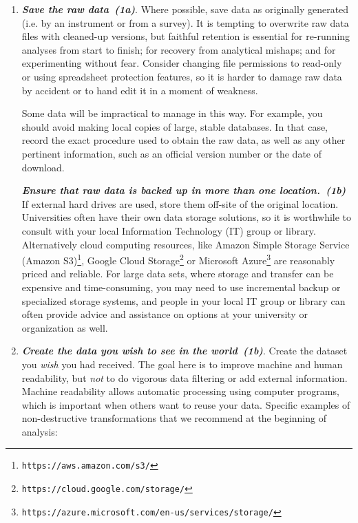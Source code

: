 \documentclass[10pt,letterpaper]{article}
\newcommand{\withurl}[2]{{#1}\footnote{{\texttt{#2}}}}
\newcommand{\practice}[2]{\textbf{\emph{{#2}~({#1})}}}
\begin{document}
\begin{enumerate}

\item

  \practice{1a}{Save the raw data}.  Where possible, save data as
  originally generated (i.e. by an instrument or from a survey).  It
  is tempting to overwrite raw data files with cleaned-up versions,
  but faithful retention is essential for re-running analyses from
  start to finish; for recovery from analytical mishaps; and for
  experimenting without fear. Consider changing file permissions to
  read-only or using spreadsheet protection features, so it is harder
  to damage raw data by accident or to hand edit it in a moment of
  weakness.

  Some data will be impractical to manage in this way. For example,
  you should avoid making local copies of large, stable databases.  In
  that case, record the exact procedure used to obtain the raw data,
  as well as any other pertinent information, such as an official
  version number or the date of download.
  
  \practice{1b}{Ensure that raw data is backed up in more than one
  location.} If external hard drives are used, store them off-site
  of the original location. Universities often have their own data
  storage solutions, so it is worthwhile to consult with your local
  Information Technology (IT) group or library.  Alternatively cloud
  computing resources, like  \withurl{Amazon Simple Storage Service 
  (Amazon S3)}{https://aws.amazon.com/s3/}, 
  \withurl{Google Cloud Storage}{https://cloud.google.com/storage/}
  or \withurl{Microsoft Azure}
  {https://azure.microsoft.com/en-us/services/storage/}
  are reasonably priced and reliable.
  For large data sets, where storage and transfer can be
  expensive and time-consuming, you may need to use incremental backup
  or specialized storage systems, and people in your local IT group or
  library can often provide advice and assistance on options at your
  university or organization as well.

\item

  \practice{1b}{Create the data you wish to see in the world}. Create
  the dataset you \emph{wish} you had received.  The goal here is to
  improve machine and human readability, but \emph{not} to do vigorous
  data filtering or add external information.  Machine readability
  allows automatic processing using computer programs, which is
  important when others want to reuse your data.  Specific examples of
  non-destructive transformations that we recommend at the beginning
  of analysis:


\end{enumerate}
\end{document}
